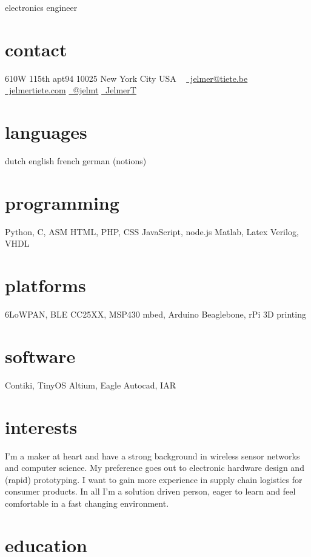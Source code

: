 \documentclass[]{friggeri-cv}
\begin{document}
       {electronics engineer}


\begin{aside}
  \section{contact}
    610W 115th apt94
    10025 New York City
    USA
    ~
    \href{mailto:jelmer@tiete.be}{\textcolor{textcolor}{\faEnvelopeAlt}~jelmer@tiete.be}
    \href{http://jelmertiete.com}{\textcolor{textcolor}{\faGlobe}~jelmertiete.com}
    \href{http://twitter.com/jelmt}{\textcolor{textcolor}{\faTwitter}~@jelmt}
    \href{https://github.com/JelmerT}{\textcolor{textcolor}{\faGithub}~JelmerT}
  \section{languages}
    dutch
    english
    french
    german (notions)
  \section{programming}
    Python, C, ASM
    HTML, PHP, CSS
    JavaScript, node.js
    Matlab, Latex
    Verilog, VHDL
  \section{platforms}
    6LoWPAN, BLE
    CC25XX, MSP430
    mbed, Arduino
    Beaglebone, rPi
    3D printing
  \section{software}
    Contiki, TinyOS
    Altium, Eagle
    Autocad, IAR
\end{aside}

\section{interests}
I'm a maker at heart and have a strong background in wireless sensor networks and computer science. My preference goes out to electronic hardware design and (rapid) prototyping. I want to gain more experience in supply chain logistics for consumer products. In all I'm a solution driven person, eager to learn and feel comfortable in a fast changing environment.

\section{education}
\end{document}
